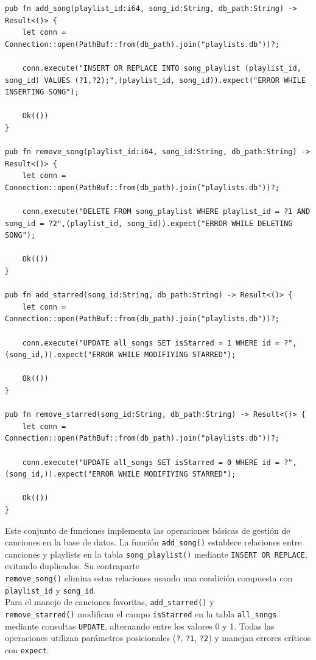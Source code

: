 \documentclass[11pt, a4paper]{article}
\begin{document}
            \begin{lstlisting}[caption={Operaciones CRUD canciones}]
pub fn add_song(playlist_id:i64, song_id:String, db_path:String) -> Result<()> {
    let conn = Connection::open(PathBuf::from(db_path).join("playlists.db"))?;

    conn.execute("INSERT OR REPLACE INTO song_playlist (playlist_id, song_id) VALUES (?1,?2);",(playlist_id, song_id)).expect("ERROR WHILE INSERTING SONG");

    Ok(())
}

pub fn remove_song(playlist_id:i64, song_id:String, db_path:String) -> Result<()> {
    let conn = Connection::open(PathBuf::from(db_path).join("playlists.db"))?;

    conn.execute("DELETE FROM song_playlist WHERE playlist_id = ?1 AND song_id = ?2",(playlist_id, song_id)).expect("ERROR WHILE DELETING SONG");

    Ok(())
}

pub fn add_starred(song_id:String, db_path:String) -> Result<()> {
    let conn = Connection::open(PathBuf::from(db_path).join("playlists.db"))?;

    conn.execute("UPDATE all_songs SET isStarred = 1 WHERE id = ?",(song_id,)).expect("ERROR WHILE MODIFIYING STARRED");

    Ok(())
}

pub fn remove_starred(song_id:String, db_path:String) -> Result<()> {
    let conn = Connection::open(PathBuf::from(db_path).join("playlists.db"))?;

    conn.execute("UPDATE all_songs SET isStarred = 0 WHERE id = ?",(song_id,)).expect("ERROR WHILE MODIFIYING STARRED");

    Ok(())
}
            \end{lstlisting}

            Este conjunto de funciones implementa las operaciones básicas de gestión de canciones en la base de datos. La función \texttt{add\_song()} establece relaciones entre canciones y playlists en la tabla \texttt{song\_playlist()} mediante \texttt{INSERT OR REPLACE}, evitando duplicados. Su contraparte \\ \texttt{remove\_song()} elimina estas relaciones usando una condición compuesta con \texttt{playlist\_id} y \texttt{song\_id}. \\
            
            Para el manejo de canciones favoritas, \texttt{add\_starred()} y \\ \texttt{remove\_starred()} modifican el campo \texttt{isStarred} en la tabla \texttt{all\_songs} mediante consultas \texttt{UPDATE}, alternando entre los valores 0 y 1. Todas las operaciones utilizan parámetros posicionales (\texttt{?}, \texttt{?1}, \texttt{?2}) y manejan errores críticos con \texttt{expect}. \\
\end{document}
